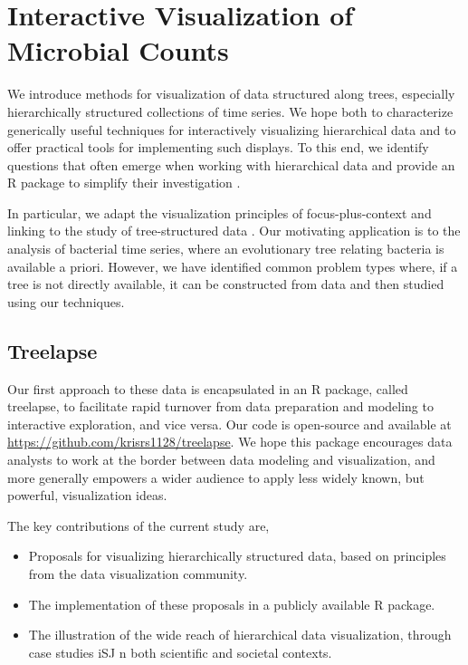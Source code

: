 \chapter{Interactive Visualization of Microbial Counts}
\label{ch:interactive_vis}

We introduce methods for visualization of data structured along trees,
especially hierarchically structured collections of time series. We hope both to
characterize generically useful techniques for interactively visualizing
hierarchical data and to offer practical tools for implementing such displays.
To this end, we identify questions that often emerge when working with
hierarchical data and provide an R package to simplify their investigation
\citep{rlanguage}.

In particular, we adapt the visualization principles of focus-plus-context and
linking to the study of tree-structured data \citep{buja1996interactive,
  becker1987brushing}. Our motivating application is to the analysis of
bacterial time series, where an evolutionary tree relating bacteria is available
a priori. However, we have identified common problem types where, if a tree is
not directly available, it can be constructed from data and then studied using
our techniques.

\section{Treelapse}\label{introduction}

Our first approach to these data is encapsulated in an R package, called
treelapse, to facilitate rapid turnover from data preparation and modeling to
interactive exploration, and vice versa. Our code is open-source and available
at \url{https://github.com/krisrs1128/treelapse}. We hope this package
encourages data analysts to work at the border between data modeling and
visualization, and more generally empowers a wider audience to apply less widely
known, but powerful, visualization ideas.

The key contributions of the current study are,
\begin{itemize}
\item Proposals for visualizing hierarchically structured data, based on
  principles from the data visualization community.
\item The implementation of these proposals in a publicly available R package.
\item The illustration of the wide reach of hierarchical data visualization,
  through case studies iSJ n both scientific and societal contexts.
\end{itemize}

